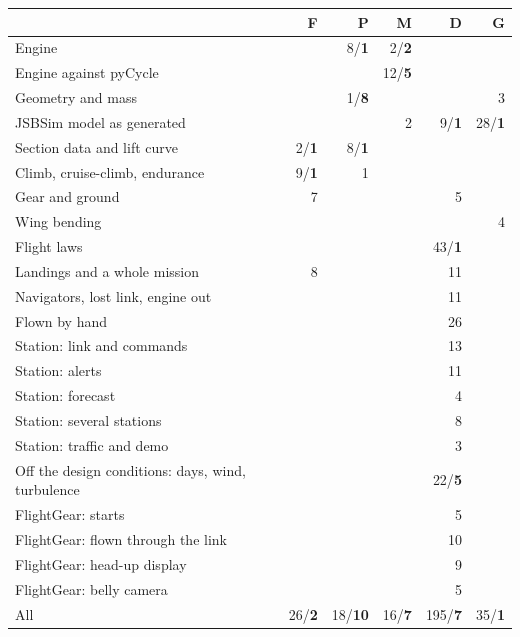 \begin{tabularx}{\columnwidth}{@{}>{\raggedright\arraybackslash}Xrrrrr@{}}
\toprule
 & F & P & M & D & G \\
\midrule
Engine &  & 8/\textbf{1} & 2/\textbf{2} &  &  \\
Engine against pyCycle &  &  & 12/\textbf{5} &  &  \\
Geometry and mass &  & 1/\textbf{8} &  &  & 3 \\
JSBSim model as generated &  &  & 2 & 9/\textbf{1} & 28/\textbf{1} \\
Section data and lift curve & 2/\textbf{1} & 8/\textbf{1} &  &  &  \\
Climb, cruise-climb, endurance & 9/\textbf{1} & 1 &  &  &  \\
Gear and ground & 7 &  &  & 5 &  \\
Wing bending &  &  &  &  & 4 \\
Flight laws &  &  &  & 43/\textbf{1} &  \\
Landings and a whole mission & 8 &  &  & 11 &  \\
Navigators, lost link, engine out &  &  &  & 11 &  \\
Flown by hand &  &  &  & 26 &  \\
Station: link and commands &  &  &  & 13 &  \\
Station: alerts &  &  &  & 11 &  \\
Station: forecast &  &  &  & 4 &  \\
Station: several stations &  &  &  & 8 &  \\
Station: traffic and demo &  &  &  & 3 &  \\
Off the design conditions: days, wind, turbulence &  &  &  & 22/\textbf{5} &  \\
FlightGear: starts &  &  &  & 5 &  \\
FlightGear: flown through the link &  &  &  & 10 &  \\
FlightGear: head-up display &  &  &  & 9 &  \\
FlightGear: belly camera &  &  &  & 5 &  \\
\midrule
All & 26/\textbf{2} & 18/\textbf{10} & 16/\textbf{7} & 195/\textbf{7} & 35/\textbf{1} \\
\bottomrule
\end{tabularx}
